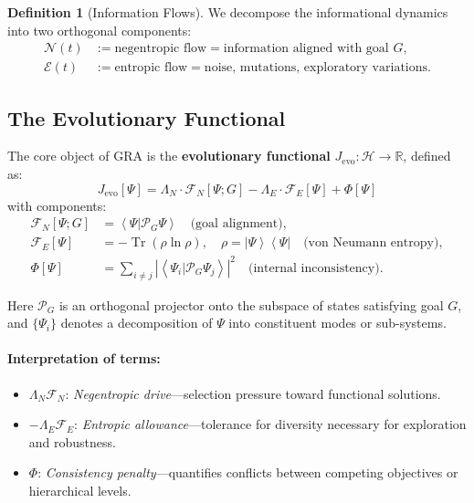 \documentclass[11pt,a4paper]{article}
\theoremstyle{plain}
\theoremstyle{definition}
\newtheorem{definition}[theorem]{Definition}
\theoremstyle{remark}
\newcommand{\Hilbert}{\mathcal{H}}
\newcommand{\NegEntropy}{\mathcal{N}}
\newcommand{\Entropy}{\mathcal{E}}
\newcommand{\Foam}{\Phi}
\newcommand{\Projector}{\mathcal{P}}
\newcommand{\Functional}{\mathcal{F}}
\newcommand{\ket}[1]{\left|#1\right\rangle}
\newcommand{\bra}[1]{\left\langle#1\right|}
\newcommand{\braket}[2]{\left\langle#1|#2\right\rangle}
\newcommand{\tr}{\operatorname{Tr}}
\newcommand{\Real}{\mathbb{R}}
\begin{document}
\begin{definition}[Information Flows]
We decompose the informational dynamics into two orthogonal components:
\begin{align}
    \NegEntropy(t) &:= \text{negentropic flow} = \text{information aligned with goal } G, \label{eq:negentropy} \\
    \Entropy(t) &:= \text{entropic flow} = \text{noise, mutations, exploratory variations}. \label{eq:entropy}
\end{align}
\end{definition}

\subsection{The Evolutionary Functional}

The core object of GRA is the \textbf{evolutionary functional} $J_{\text{evo}}: \Hilbert \to \Real$, defined as:
\begin{equation}
\boxed{
J_{\text{evo}}[\Psi] = \Lambda_N \cdot \Functional_N[\Psi; G] - \Lambda_E \cdot \Functional_E[\Psi] + \Foam[\Psi]
}
\label{eq:J_evo}
\end{equation}
with components:
\begin{align}
    \Functional_N[\Psi; G] &= \braket{\Psi}{\Projector_G \Psi} \quad \text{(goal alignment)}, \label{eq:F_N} \\
    \Functional_E[\Psi] &= -\tr(\rho \ln \rho), \quad \rho = \ket{\Psi}\bra{\Psi} \quad \text{(von Neumann entropy)}, \label{eq:F_E} \\
    \Foam[\Psi] &= \sum_{i \neq j} \left| \braket{\Psi_i}{\Projector_G \Psi_j} \right|^2 \quad \text{(internal inconsistency)}. \label{eq:foam}
\end{align}

\noindent Here $\Projector_G$ is an orthogonal projector onto the subspace of states satisfying goal $G$, and $\{\Psi_i\}$ denotes a decomposition of $\Psi$ into constituent modes or sub-systems.

\paragraph{Interpretation of terms:}
\begin{itemize}
    \item $\Lambda_N \Functional_N$: \textit{Negentropic drive}---selection pressure toward functional solutions.
    \item $-\Lambda_E \Functional_E$: \textit{Entropic allowance}---tolerance for diversity necessary for exploration and robustness.
    \item $\Foam$: \textit{Consistency penalty}---quantifies conflicts between competing objectives or hierarchical levels.
\end{itemize}
\end{document}
